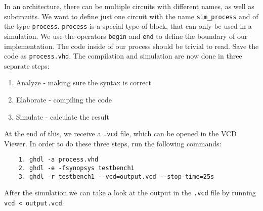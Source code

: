 \documentclass{dcbl/challenge}
\begin{document}
\begin{aufgabe}
    In an architecture, there can be multiple circuits with different names, as well as subcircuits.
    We want to define just one circuit with the name \texttt{sim\_process} and of the type \texttt{process}.
    \texttt{process} is a special type of block, that can only be used in a simulation. 
    We use the operators \texttt{begin} and \texttt{end} to define the boundary of our implementation.
    The code inside of our process should be trivial to read.
    Save the code as \texttt{process.vhd}.
    The compilation and simulation are now done in three separate steps:
    \begin{enumerate}
        \item Analyze - making sure the syntax is correct
        \item Elaborate - compiling the code
        \item Simulate - calculate the result
    \end{enumerate}
    At the end of this, we receive a \texttt{.vcd} file, which can be opened in the VCD Viewer.
    In order to do these three steps, run the following commands:
    \begin{lstlisting}
    1. ghdl -a process.vhd
    2. ghdl -e -fsynopsys testbench1
    3. ghdl -r testbench1 --vcd=output.vcd --stop-time=25s
    \end{lstlisting}
    After the simulation we can take a look at the output in the \texttt{.vcd} file by running \texttt{vcd < output.vcd}.
\end{aufgabe}
\end{document}
